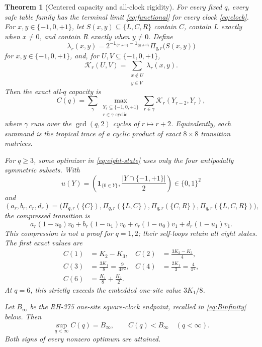 \documentclass[11pt]{article}
\newtheorem{theorem}{Theorem}[section]
\theoremstyle{definition}
\theoremstyle{remark}
\newcommand{\ind}{\mathbf 1}
\newcommand{\T}{\{-1,0,+1\}}
\begin{document}
\begin{theorem}[Centered capacity and all-clock rigidity]
\label{thm:main}
For every fixed \(q\), every safe table family has the terminal limit
\eqref{eq:functional} for every clock \eqref{eq:clock}.  For \(x,y\in\T\),
let \(S(x,y)\subseteq\{L,C,R\}\) contain \(C\), contain \(L\) exactly
when \(x\ne0\), and contain \(R\) exactly when \(y\ne0\).  Define
\begin{equation}
 \lambda_r(x,y)=
 2^{-\ind_{\{x\ne0\}}-\ind_{\{y\ne0\}}}
 \Pi_{q,r}\bigl(S(x,y)\bigr)
 \label{eq:lambda}
\end{equation}
for \(x,y\in\T\), and, for \(U,V\subseteq\T\),
\begin{equation}
 \mathcal K_r(U,V)=
 \sum_{\substack{x\notin U\\y\in V}}\lambda_r(x,y).
 \label{eq:transition}
\end{equation}
Then the exact all-\(q\) capacity is
\begin{equation}
 \boxed{\displaystyle
 C(q)=\sum_{\gamma}
 \max_{\substack{Y_r\subseteq\T\\r\in\gamma\text{ cyclic}}}
 \sum_{r\in\gamma}\mathcal K_r(Y_{r-2},Y_r),}
 \label{eq:eight-state}
\end{equation}
where \(\gamma\) runs over the \(\gcd(q,2)\) cycles of \(r\mapsto r+2\).
Equivalently, each summand is the tropical trace of a cyclic product of
exact \(8\times8\) transition matrices.

For \(q\geq3\), some optimizer in \eqref{eq:eight-state} uses only the
four antipodally symmetric subsets.  With
\[
 u(Y)=\left(\ind_{\{0\in Y\}},
 \frac{|Y\cap\{-1,+1\}|}{2}\right)\in\{0,1\}^2
\]
and
\[
 (a_r,b_r,c_r,d_r)=
 \bigl(\Pi_{q,r}(\{C\}),\Pi_{q,r}(\{L,C\}),
 \Pi_{q,r}(\{C,R\}),\Pi_{q,r}(\{L,C,R\})\bigr),
\]
the compressed transition is
\begin{equation}
 a_r(1-u_0)v_0+b_r(1-u_1)v_0+
 c_r(1-u_0)v_1+d_r(1-u_1)v_1.
 \label{eq:four-state}
\end{equation}
This compression is not a proof for \(q=1,2\); their self-loops retain all
eight states.  The first exact values are
\begin{align}
 C(1)&=K_2-K_3,&
 C(2)&=\frac{3K_2-K_3}{4},\label{eq:C12}\\
 C(3)&=\frac{3K_1}{8}=\frac9{4\pi^2},&
 C(4)&=\frac{2K_1}{3}=\frac4{\pi^2},\label{eq:C34}\\
 C(6)&=\frac{K_1}{8}+\frac{K_2}{2}.&&
 \label{eq:C6}
\end{align}
At \(q=6\), this strictly exceeds the embedded one-site value
\(3K_1/8\).

Let \(B_\infty\) be the RH-375 one-site square-clock endpoint, recalled in
\eqref{eq:Binfinity} below.  Then
\begin{equation}
 \boxed{\displaystyle\sup_{q<\infty}C(q)=B_\infty,\qquad
 C(q)<B_\infty\quad(q<\infty).}
 \label{eq:all-clock}
\end{equation}
Both signs of every nonzero optimum are attained.
\end{theorem}
\end{document}
